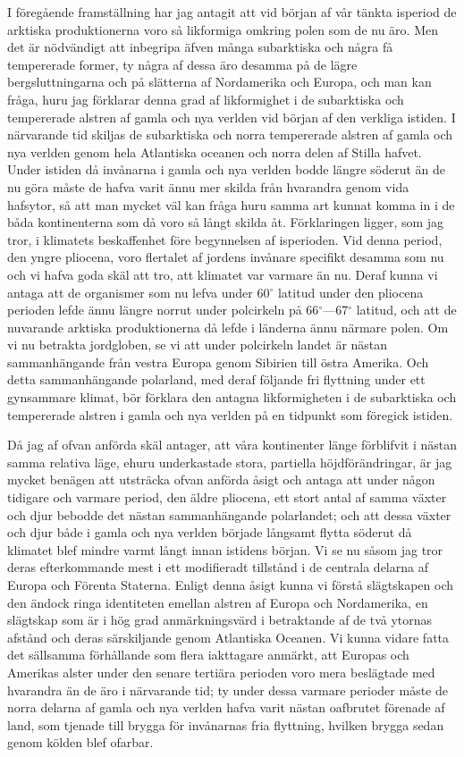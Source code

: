 I föregående framställning har jag antagit att vid början af vår tänkta isperiod de arktiska produktionerna voro så likformiga omkring polen som de nu äro. Men det är nödvändigt att inbegripa äfven många subarktiska och några få tempererade former, ty några af dessa äro desamma på de lägre bergsluttningarna och på slätterna af Nordamerika och Europa, och man kan fråga, huru jag förklarar denna grad af likformighet i de subarktiska och tempererade alstren af gamla och nya verlden vid början af den verkliga istiden. I närvarande tid skiljas de subarktiska och norra tempererade alstren af gamla och nya verlden genom hela Atlantiska oceanen och norra delen af Stilla hafvet. Under istiden då invånarna i gamla och nya verlden bodde längre söderut än de nu göra måste de hafva varit ännu mer skilda från hvarandra genom vida hafsytor, så att man mycket väl kan fråga huru samma art kunnat komma in i de båda kontinenterna som då voro så långt skilda åt. Förklaringen ligger, som jag tror, i klimatets beskaffenhet före begynnelsen af isperioden. Vid denna period, den yngre pliocena, voro flertalet af jordens invånare specifikt desamma som nu och vi hafva goda skäl att tro, att klimatet var varmare än nu. Deraf kunna vi antaga att de organismer som nu lefva under 60${}^\circ$ latitud under den pliocena perioden lefde ännu längre norrut under polcirkeln på 66${}^\circ$—67${}^\circ$ latitud, och att de nuvarande arktiska produktionerna då lefde i länderna ännu närmare polen. Om vi nu betrakta jordgloben, se vi att under polcirkeln landet är nästan sammanhängande från vestra Europa genom Sibirien till östra Amerika. Och detta sammanhängande polarland, med deraf följande fri flyttning under ett gynsammare klimat, bör förklara den antagna likformigheten i de subarktiska och tempererade alstren i gamla och nya verlden på en tidpunkt som föregick istiden.

Då jag af ofvan anförda skäl antager, att våra kontinenter länge förblifvit i nästan samma relativa läge, ehuru underkastade stora, partiella höjdförändringar, är jag mycket benägen att utsträcka ofvan anförda åsigt och antaga att under någon tidigare och varmare period, den äldre pliocena, ett stort antal af samma växter och djur bebodde det nästan sammanhängande polarlandet; och att dessa växter och djur både i gamla och nya verlden började långsamt flytta söderut då klimatet blef mindre varmt långt innan istidens början. Vi se nu såsom jag tror deras efterkommande mest i ett modifieradt tillstånd i de centrala delarna af Europa och Förenta Staterna. Enligt denna åsigt kunna vi förstå slägtskapen och den ändock ringa identiteten emellan alstren af Europa och Nordamerika, en slägtskap som är i hög grad anmärkningsvärd i betraktande af de två ytornas afstånd och deras särskiljande genom Atlantiska Oceanen. Vi kunna vidare fatta det sällsamma förhållande som flera iakttagare anmärkt, att Europas och Amerikas alster under den senare tertiära perioden voro mera beslägtade med hvarandra än de äro i närvarande tid; ty under dessa varmare perioder måste de norra delarna af gamla och nya verlden hafva varit nästan oafbrutet förenade af land, som tjenade till brygga för invånarnas fria flyttning, hvilken brygga sedan genom kölden blef ofarbar.

